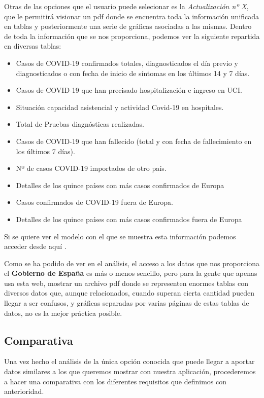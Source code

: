 Otras de las opciones que el usuario puede selecionar es la \textit{Actualización nº X}, que le permitirá visionar un pdf donde se encuentra toda la información unificada en tablas y posteriormente una serie de gráficas asociadas a las mismas. Dentro de toda la información que se nos proporciona, podemos ver la siguiente repartida en diversas tablas:

\begin{itemize}
	\item Casos de COVID-19 confirmados totales, diagnosticados el día previo y diagnosticados o con fecha de inicio de síntomas en los últimos 14 y 7 días.
	\item Casos de COVID-19 que han precisado hospitalización e ingreso en UCI. 
	\item Situación capacidad asistencial y actividad Covid-19 en hospitales.
	\item Total de Pruebas diagnósticas realizadas.
	\item Casos de COVID-19 que han fallecido (total y con fecha de fallecimiento en los últimos 7 días).
	\item Nº de casos COVID-19 importados de otro país.
	\item Detalles de los quince países con más casos confirmados de Europa
	\item Casos confirmados de COVID-19 fuera de Europa.
	\item Detalles de los quince países con más casos confirmados fuera de Europa
\end{itemize}

Si se quiere ver el modelo con el que se muestra esta información podemos acceder desde aquí \cite{actualizacion-gob}.

Como se ha podido de ver en el análisis, el acceso a los datos que nos proporciona el \textbf{Gobierno de España} es más o menos sencillo, pero para la gente que apenas usa esta web, mostrar un archivo pdf donde se representen enormes tablas con diversos datos que, aunque relacionados, cuando superan cierta cantidad pueden llegar a ser confusos, y gráficas separadas por varias páginas de estas tablas de datos, no es la mejor práctica posible.

\subsection{Comparativa}

Una vez hecho el análisis de la única opción conocida que puede llegar a aportar datos similares a los que queremos mostrar con nuestra aplicación, procederemos a hacer una comparativa con los diferentes requisitos que definimos con anterioridad.

